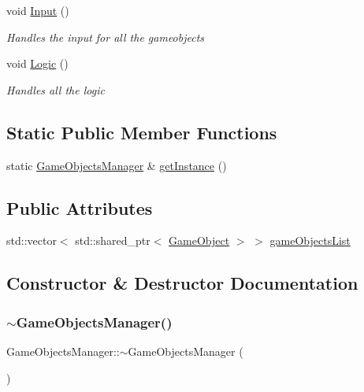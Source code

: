 \begin{DoxyCompactItemize}
void \mbox{\hyperlink{class_game_objects_manager_a9f5ca8d981a423e9c5ab56978a1cd99e}{Input}} ()
\begin{DoxyCompactList}\small\item\em Handles the input for all the gameobjects \end{DoxyCompactList}\item 
void \mbox{\hyperlink{class_game_objects_manager_ac77aa52afc2dfbb678c51a27022fc60a}{Logic}} ()
\begin{DoxyCompactList}\small\item\em Handles all the logic \end{DoxyCompactList}\end{DoxyCompactItemize}
\subsection*{Static Public Member Functions}
\begin{DoxyCompactItemize}
\item 
static \mbox{\hyperlink{class_game_objects_manager}{Game\+Objects\+Manager}} \& \mbox{\hyperlink{class_game_objects_manager_a905058214bee04ccfd466381261d4c0e}{get\+Instance}} ()
\end{DoxyCompactItemize}
\subsection*{Public Attributes}
\begin{DoxyCompactItemize}
\item 
std\+::vector$<$ std\+::shared\+\_\+ptr$<$ \mbox{\hyperlink{class_game_object}{Game\+Object}} $>$ $>$ \mbox{\hyperlink{class_game_objects_manager_a9abd27653014d01700f60391041b6bb8}{game\+Objects\+List}}
\end{DoxyCompactItemize}


\subsection{Constructor \& Destructor Documentation}
\mbox{\label{class_game_objects_manager_abe5aece84355a01f2473b41217f28026}} 
\subsubsection{\texorpdfstring{$\sim$\+Game\+Objects\+Manager()}{~GameObjectsManager()}}
{\footnotesize\ttfamily Game\+Objects\+Manager\+::$\sim$\+Game\+Objects\+Manager (\begin{DoxyParamCaption}{ }\end{DoxyParamCaption})}



